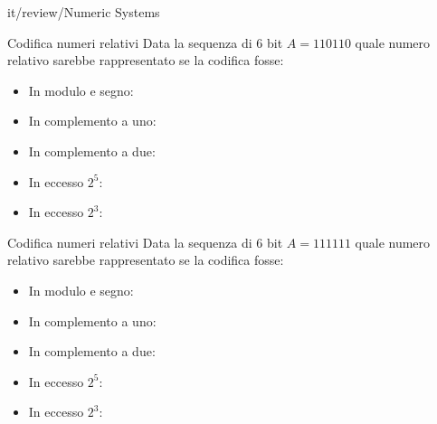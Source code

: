 \documentclass[11pt]{article}
\begin{document}
\begin{quiz}{it/review/Numeric Systems}
\begin{cloze}[points=1,shuffle=false]{Codifica numeri relativi}
Data la sequenza di 6 bit $A = 110110$ quale numero relativo sarebbe rappresentato se la codifica fosse:
\begin{itemize}
\item In modulo e segno: 
\item In complemento a uno: 
\item In complemento a due: 
\item In eccesso $2^5$: 
\item In eccesso $2^3$: 
\end{itemize}
\end{cloze}

\begin{cloze}[points=1,shuffle=false]{Codifica numeri relativi}
Data la sequenza di 6 bit $A = 111111$ quale numero relativo sarebbe rappresentato se la codifica fosse:
\begin{itemize}
\item In modulo e segno: 
\item In complemento a uno: 
\item In complemento a due: 
\item In eccesso $2^5$: 
\item In eccesso $2^3$: 
\end{itemize}
\end{cloze}


\end{quiz}
\end{document}
